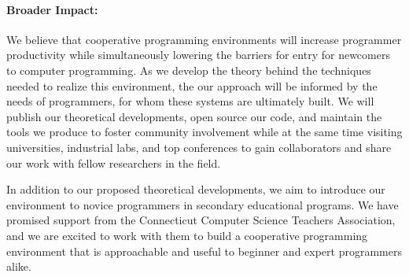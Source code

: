 \paragraph{Broader Impact:} We believe that cooperative programming environments will increase programmer productivity while simultaneously lowering the barriers for entry for newcomers to computer programming. As we develop the theory behind the techniques needed to realize this environment, the our approach will be informed by the needs of programmers, for whom these systems are ultimately built. We will publish our theoretical developments, open source our code, and maintain the tools we produce to foster community involvement while at the same time visiting universities, industrial labs, and top conferences to gain collaborators and share our work with fellow researchers in the field.

In addition to our proposed theoretical developments, we aim to introduce our environment to novice programmers in secondary educational programs. We have promised support from the Connecticut Computer Science Teachers Association, and we are excited to work with them to build a cooperative programming environment that is approachable and useful to beginner and expert programmers alike.
